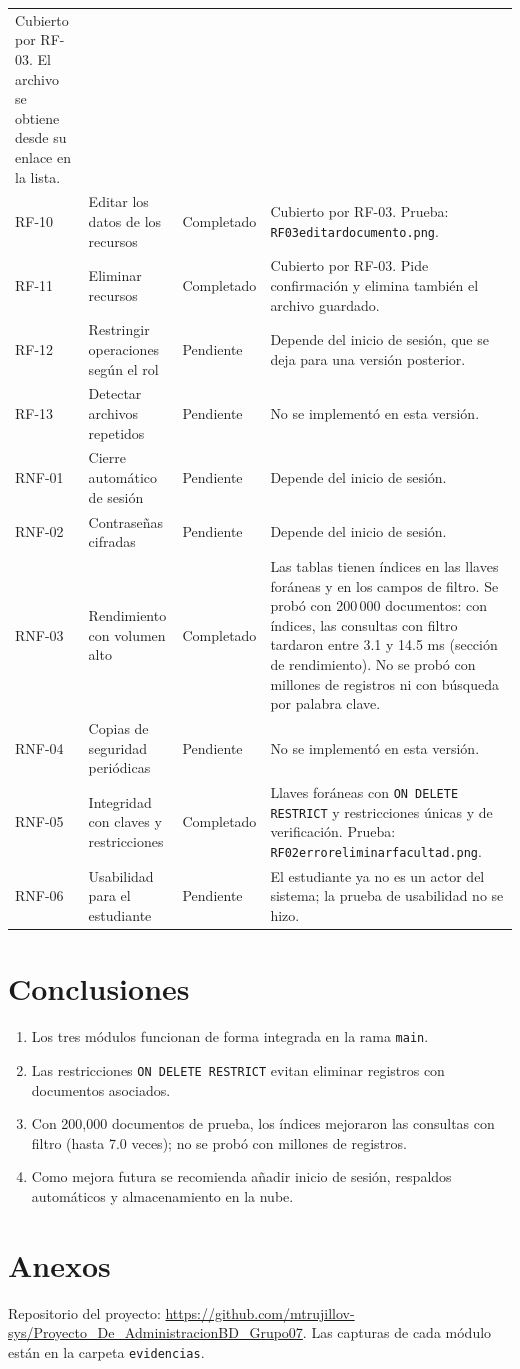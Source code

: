 \documentclass[12pt,a4paper,oneside]{article}
\providecommand{\evus}{\textunderscore\allowbreak}
\providecommand{\ev}[1]{{\texttt{\scriptsize\let\_\evus #1}}}
\begin{document}
\begin{longtable}{>{\raggedright\arraybackslash}p{1.3cm}>{\raggedright\arraybackslash}p{4.6cm}>{\raggedright\arraybackslash}p{1.9cm}>{\raggedright\arraybackslash}p{7.0cm}}
Cubierto por RF-03. El archivo se obtiene desde su enlace en la lista. \\
RF-10 & Editar los datos de los recursos & Completado &
Cubierto por RF-03. Prueba: \ev{RF03\_editar\_documento.png}. \\
RF-11 & Eliminar recursos & Completado &
Cubierto por RF-03. Pide confirmación y elimina también el archivo guardado. \\
RF-12 & Restringir operaciones según el rol & Pendiente &
Depende del inicio de sesión, que se deja para una versión posterior. \\
RF-13 & Detectar archivos repetidos & Pendiente & No se implementó en esta versión. \\
\addlinespace
RNF-01 & Cierre automático de sesión & Pendiente & Depende del inicio de sesión. \\
RNF-02 & Contraseñas cifradas & Pendiente & Depende del inicio de sesión. \\
RNF-03 & Rendimiento con volumen alto & Completado &
Las tablas tienen índices en las llaves foráneas y en los campos de filtro. Se probó con
200\,000 documentos: con índices, las consultas con filtro tardaron entre 3.1 y 14.5 ms
(sección de rendimiento). No se probó con millones de registros ni con búsqueda por palabra
clave. \\
RNF-04 & Copias de seguridad periódicas & Pendiente & No se implementó en esta versión. \\
RNF-05 & Integridad con claves y restricciones & Completado &
Llaves foráneas con \texttt{ON DELETE RESTRICT} y restricciones únicas y de verificación.
Prueba: \ev{RF02\_error\_eliminar\_facultad.png}. \\
RNF-06 & Usabilidad para el estudiante & Pendiente &
El estudiante ya no es un actor del sistema; la prueba de usabilidad no se hizo. \\
\bottomrule
\end{longtable}
\endgroup

\section{Conclusiones}
\begin{enumerate}[leftmargin=1.8em]
\item Los tres módulos funcionan de forma integrada en la rama \texttt{main}.
\item Las restricciones \texttt{ON DELETE RESTRICT} evitan eliminar registros con documentos asociados.
\item Con 200{,}000 documentos de prueba, los índices mejoraron las consultas con filtro (hasta 7.0 veces); no se probó con millones de registros.
\item Como mejora futura se recomienda añadir inicio de sesión, respaldos automáticos y almacenamiento en la nube.
\end{enumerate}

\appendix
\section{Anexos}
Repositorio del proyecto: \url{https://github.com/mtrujillov-sys/Proyecto_De_AdministracionBD_Grupo07}. Las capturas de cada módulo están en la carpeta \texttt{evidencias}.
\end{document}
